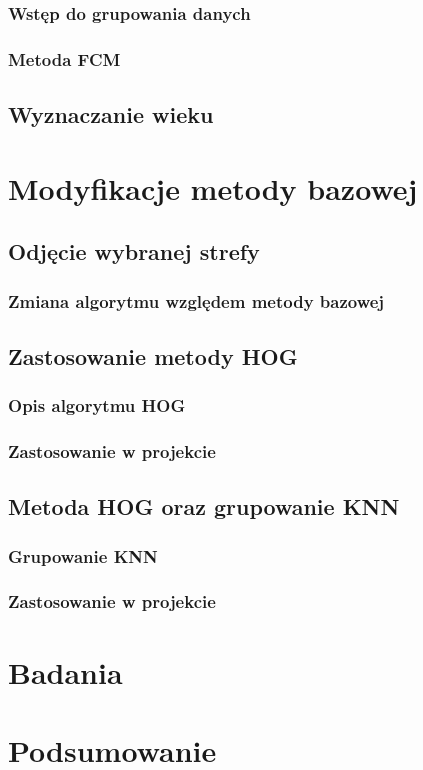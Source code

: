 \subsection{Wstęp do grupowania danych}
\subsection{Metoda FCM}

\section{Wyznaczanie wieku}\label{sec:wyznaczanieWieku}



\chapter{Modyfikacje metody bazowej}

\section{Odjęcie wybranej strefy}

\subsection{Zmiana algorytmu względem metody bazowej}

\section{Zastosowanie metody HOG}
\subsection{Opis algorytmu HOG}
\subsection{Zastosowanie w projekcie}

\section{Metoda HOG oraz grupowanie KNN}
\subsection{Grupowanie KNN}
\subsection{Zastosowanie w projekcie}
\chapter{Badania}

\chapter{Podsumowanie}








